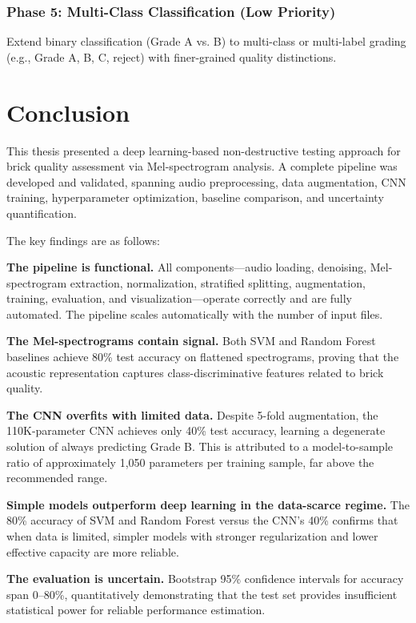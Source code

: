 \documentclass[12pt,a4paper,oneside]{report}
\begin{document}
\subsection{Phase 5: Multi-Class Classification (Low Priority)}

Extend binary classification (Grade A vs. B) to multi-class or multi-label grading (e.g., Grade A, B, C, reject) with finer-grained quality distinctions.

\chapter{Conclusion}
\label{ch:conclusion}

This thesis presented a deep learning-based non-destructive testing approach for brick quality assessment via Mel-spectrogram analysis. A complete pipeline was developed and validated, spanning audio preprocessing, data augmentation, CNN training, hyperparameter optimization, baseline comparison, and uncertainty quantification.

The key findings are as follows:

\textbf{The pipeline is functional.} All components---audio loading, denoising, Mel-spectrogram extraction, normalization, stratified splitting, augmentation, training, evaluation, and visualization---operate correctly and are fully automated. The pipeline scales automatically with the number of input files.

\textbf{The Mel-spectrograms contain signal.} Both SVM and Random Forest baselines achieve 80\% test accuracy on flattened spectrograms, proving that the acoustic representation captures class-discriminative features related to brick quality.

\textbf{The CNN overfits with limited data.} Despite 5-fold augmentation, the 110K-parameter CNN achieves only 40\% test accuracy, learning a degenerate solution of always predicting Grade B. This is attributed to a model-to-sample ratio of approximately 1,050 parameters per training sample, far above the recommended range.

\textbf{Simple models outperform deep learning in the data-scarce regime.} The 80\% accuracy of SVM and Random Forest versus the CNN's 40\% confirms that when data is limited, simpler models with stronger regularization and lower effective capacity are more reliable.

\textbf{The evaluation is uncertain.} Bootstrap 95\% confidence intervals for accuracy span 0--80\%, quantitatively demonstrating that the test set provides insufficient statistical power for reliable performance estimation.
\end{document}
